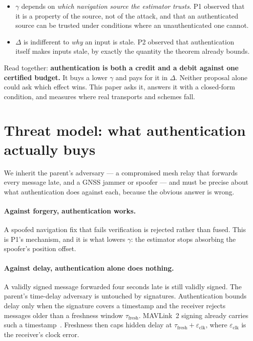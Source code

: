 \documentclass[11pt,a4paper]{article}
\newcommand{\tfresh}{\tau_{\mathrm{fresh}}}
\newcommand{\eclk}{\varepsilon_{\mathrm{clk}}}
\begin{document}
\begin{itemize}
\item $\gamma$ depends on \emph{which navigation source the estimator trusts}.
  P1 observed that it is a property of the source, not of the attack, and that
  an authenticated source can be trusted under conditions where an
  unauthenticated one cannot.
\item $\Delta$ is indifferent to \emph{why} an input is stale. P2 observed that
  authentication itself makes inputs stale, by exactly the quantity the theorem
  already bounds.
\end{itemize}

\noindent
Read together: \textbf{authentication is both a credit and a debit against one
certified budget.} It buys a lower $\gamma$ and pays for it in $\Delta$. Neither
proposal alone could ask which effect wins. This paper asks it, answers it with
a closed-form condition, and measures where real transports and schemes fall.

\section{Threat model: what authentication actually buys}
We inherit the parent's adversary --- a compromised mesh relay that forwards
every message late, and a GNSS jammer or spoofer --- and must be precise about
what authentication does against each, because the obvious answer is wrong.

\paragraph{Against forgery, authentication works.} A spoofed navigation fix
that fails verification is rejected rather than fused. This is P1's mechanism,
and it is what lowers $\gamma$: the estimator stops absorbing the spoofer's
position offset.

\paragraph{Against delay, authentication alone does nothing.} A validly signed
message forwarded four seconds late is still validly signed. The parent's
time-delay adversary is untouched by signatures. Authentication bounds delay
only when the signature covers a timestamp and the receiver rejects messages
older than a freshness window $\tfresh$. MAVLink~2 signing already carries such a
timestamp~\cite{trout_mavlink}. Freshness then caps hidden delay at
$\tfresh+\eclk$, where $\eclk$ is the receiver's clock error.
\end{document}

